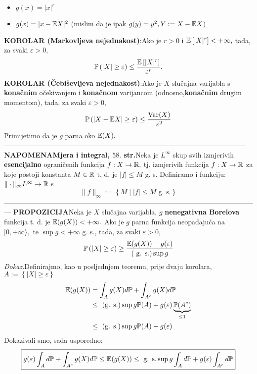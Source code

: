 \documentclass{article}
\newcommand{\Var}{\operatorname{Var}}
\begin{document}
\begin{itemize}
    \item[\ding{113}] \(g(x)=|x|^r\)
    \item[\ding{113}] \(g(x)=|x-\Bbb EX|^2\) (mislim da je ipak \(g(y)=y^2, Y:=X-\Bbb EX\))
\end{itemize}
\textbf{KOROLAR (Markovljeva nejednakost)}:\newline Ako je \(r>0\) i \(\Bbb E\left[|X|^r\right]<+\infty,\) tada, za svaki \(\varepsilon >0,\) \[\Bbb P\left(|X|\ge\varepsilon\right)\le\frac{\Bbb E\left[|X|^r\right]}{\varepsilon^r}.\]
\textbf{KOROLAR (Čebiševljeva nejednakost)}:\newline Ako je \(X\) slučajna varijabla s \textbf{konačnim} očekivanjem i \textbf{konačnom} varijancom (odnosno,\textbf{konačnim} drugim momentom), tada, za svaki \(\varepsilon>0,\) \[\Bbb P\left(\left|X-\Bbb EX\right|\ge\varepsilon\right)\le\frac{\Var (X)}{\varepsilon^2}\] Primijetimo da je \(g\) parna oko \(\Bbb E(X).\)\newline\newline---------------------------------------------------------------------------------------------------------\newline\newline
{}\textbf{NAPOMENA}\newline \textbf{Mjera i integral, \(58.\) str.}\newline Neka je \(L^\infty\) skup svih izmjerivih \textbf{esencijalno} ograničenih funkcija \(f:X\to\Bbb R,\) tj. izmjerivih funkcija \(f:X\to\Bbb R\) za koje postoji konstanta \(M\in\Bbb R\) t. d. je \(|f|\le M\) g. s. Definiramo i funkciju: \(\|\cdot\|_\infty L^\infty\to\Bbb R\) s \[\|f\|_\infty:=\left\{M\mid |f|\le M\text{ g. s.}\right\}\]---------------------------------------------------------------------------------------------------------------\newpage
\textbf{PROPOZICIJA}\newline Neka je \(X\) slučajna varijabla, \(g\) \textbf{nenegativna Borelova} funkcija t. d. je \(\Bbb E(g(X))<+\infty.\) Ako je \(g\) parna funkcija neopadajuća na \([0,+\infty\rangle,\) te \(\sup g<+\infty\) g. s., tada, za svaki \(\varepsilon>0,\) \[\Bbb P\left(|X|\ge\varepsilon\right)\ge\frac{\Bbb E(g(X))-g(\varepsilon)}{(\text{ g. s.})\sup g}\]
\textit{Dokaz.}\newline Definirajmo, kao u posljednjem teoremu, prije dvaju korolara, \(A:=\left\{|X|\ge\varepsilon\right\}\) \[\begin{aligned}\Bbb E(g(X))&=\int_Ag(X)d\Bbb P+\int_{A^c}g(X)d\Bbb P\\&\le\text{ (g. s.)}\sup g\Bbb P(A)+g(\varepsilon)\underbrace{\Bbb P(A^c)}_{\le 1}\\&\le\text{ (g. s.)}\sup g\Bbb P(A)+g(\varepsilon)\end{aligned}\] Dokazivali smo, sada usporedno: \[\boxed{g(\varepsilon)\int_Ad\Bbb P+\int_{A^c}g(X)d\Bbb P\le\Bbb E(g(X))\le\text{ g. s.}\sup g\int_Ad\Bbb P+g(\varepsilon)\int_{A^c}d\Bbb P}\]
\end{document}
